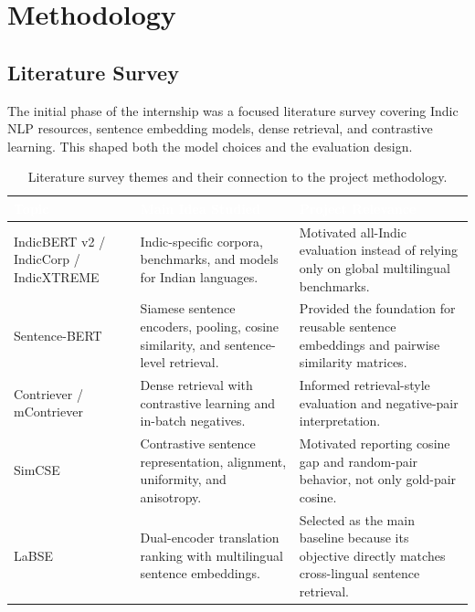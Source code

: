 \documentclass[12pt, a4paper]{article}
\begin{document}
\section{Methodology}

\subsection{Literature Survey}

The initial phase of the internship was a focused literature survey covering Indic NLP resources, sentence embedding models, dense retrieval, and contrastive learning. This shaped both the model choices and the evaluation design.

\begin{table}[H]
\centering
\footnotesize
\renewcommand{\arraystretch}{1.2}
\begin{tabular}{>{\raggedright\arraybackslash}p{3.0cm} >{\raggedright\arraybackslash}p{4.8cm} >{\raggedright\arraybackslash}p{5.0cm}}
\toprule
\rowcolor{headerblue}
\textcolor{white}{\textbf{Topic}} &
\textcolor{white}{\textbf{Main Idea Studied}} &
\textcolor{white}{\textbf{Project Relevance}} \\
\midrule
\rowcolor{rowgray}
IndicBERT v2 / IndicCorp / IndicXTREME & Indic-specific corpora, benchmarks, and models for Indian languages. & Motivated all-Indic evaluation instead of relying only on global multilingual benchmarks. \\
Sentence-BERT & Siamese sentence encoders, pooling, cosine similarity, and sentence-level retrieval. & Provided the foundation for reusable sentence embeddings and pairwise similarity matrices. \\
\rowcolor{rowgray}
Contriever / mContriever & Dense retrieval with contrastive learning and in-batch negatives. & Informed retrieval-style evaluation and negative-pair interpretation. \\
SimCSE & Contrastive sentence representation, alignment, uniformity, and anisotropy. & Motivated reporting cosine gap and random-pair behavior, not only gold-pair cosine. \\
\rowcolor{rowgray}
LaBSE & Dual-encoder translation ranking with multilingual sentence embeddings. & Selected as the main baseline because its objective directly matches cross-lingual sentence retrieval. \\
\bottomrule
\end{tabular}
\caption{Literature survey themes and their connection to the project methodology.}
\label{tab:literature_survey}
\end{table}
\end{document}
